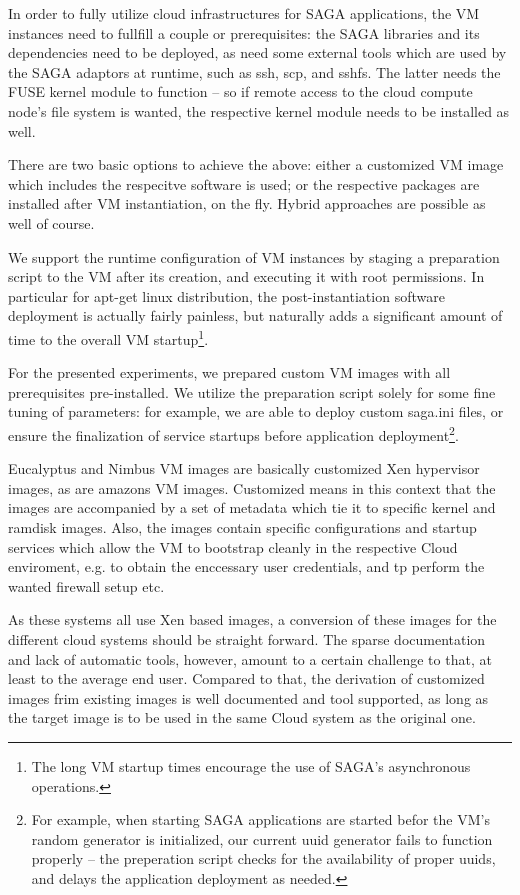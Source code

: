 
 In order to fully utilize cloud infrastructures for SAGA
 applications, the VM instances need to fullfill a couple or
 prerequisites: the SAGA libraries and its dependencies need to be
 deployed, as need some external tools which are used by the SAGA
 adaptors at runtime, such as ssh, scp, and sshfs.  The latter needs
 the FUSE kernel module to function -- so if remote access to the
 cloud compute node's file system is wanted, the respective kernel
 module needs to be installed as well.

 There are two basic options to achieve the above:  either a
 customized VM image which includes the respecitve software is used;
 or the respective packages are installed after VM instantiation, on
 the fly.  Hybrid approaches are possible as well of course.

 We support the runtime configuration of VM instances by staging a
 preparation script to the VM after its creation, and executing it
 with root permissions.  In particular for apt-get linux distribution,
 the post-instantiation software deployment is actually fairly
 painless, but naturally adds a significant amount of time to the
 overall VM startup\footnote{The long VM startup times encourage the
 use of SAGA's asynchronous operations.}.

 For the presented experiments, we prepared custom VM images with all
 prerequisites pre-installed.  We utilize the preparation script
 solely for some fine tuning of parameters: for example, we are able
 to deploy custom saga.ini files, or ensure the finalization of
 service startups before application deployment\footnote{For example,
 when starting SAGA applications are started befor the VM's random
 generator is initialized, our current uuid generator fails to
 function properly -- the preperation script checks for the
 availability of proper uuids, and delays the application deployment
 as needed.}.

 Eucalyptus and Nimbus VM images 
 are basically customized Xen hypervisor images, as are amazons VM
 images.  Customized means in this context that the images are
 accompanied by a set of metadata which tie it to specific kernel and
 ramdisk images.  Also, the images contain specific configurations and
 startup services which allow the VM to bootstrap cleanly in the
 respective Cloud enviroment, e.g. to obtain the enccessary user
 credentials, and tp perform the wanted firewall setup etc.

 As these systems all use Xen based images, a conversion of these
 images for the different cloud systems should be straight forward.
 The sparse documentation and lack of automatic tools, however, amount
 to a certain challenge to that, at least to the average end user.
 Compared to that, the derivation of customized images frim existing
 images is well documented and tool supported, as long as the target
 image is to be used in the same Cloud system as the original one.


